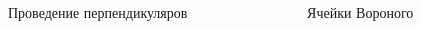 \documentclass[pdf,hyperref={unicode}]{beamer}
\begin{document}
\begin{frame}
\begin{columns}
{
\begin{column}{0.3\linewidth}
\begin{figure}[h]
\caption{Проведение перпендикуляров}
\end{figure}
\end{column}
}

{
\begin{column}{0.3\linewidth}
\begin{figure}[h]
\caption{Ячейки Вороного}
\end{figure}
\end{column}
}

\end{columns}
\end{frame}
\end{document}
